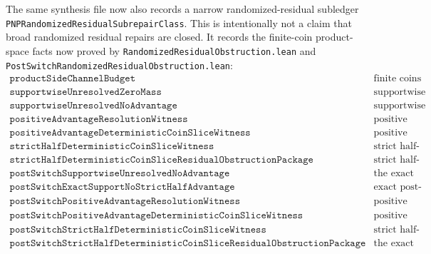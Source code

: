 \documentclass[11pt]{article}
\theoremstyle{remark}
\begin{document}
The same synthesis file now also records a narrow randomized-residual subledger
\texttt{PNPRandomizedResidualSubrepairClass}.  This is intentionally not a
claim that broad randomized residual repairs are closed.  It records the
finite-coin product-space facts now proved by
\texttt{RandomizedResidualObstruction.lean} and
\texttt{PostSwitchRandomizedResidualObstruction.lean}:
\[
\begin{array}{ll}
\texttt{productSideChannelBudget}
  & \text{finite coins are an ordinary product-space side channel,}\\
\texttt{supportwiseUnresolvedZeroMass}
  & \text{supportwise unresolved residuals have zero joint resolving mass,}\\
\texttt{supportwiseUnresolvedNoAdvantage}
  & \text{supportwise unresolved residuals have no positive advantage,}\\
\texttt{positiveAdvantageResolutionWitness}
  & \text{positive advantage yields a positive-weight resolving coin,}\\
\texttt{positiveAdvantageDeterministicCoinSliceWitness}
  & \text{positive advantage yields a deterministic resolving coin slice,}\\
\texttt{strictHalfDeterministicCoinSliceWitness}
  & \text{strict half-accuracy advantage still yields a deterministic resolving coin slice,}\\
\texttt{strictHalfDeterministicCoinSliceResidualObstructionPackage}
  & \text{strict half-accuracy advantage already yields a deterministic slice carrying the ordinary residual obstruction package,}\\
\texttt{postSwitchSupportwiseUnresolvedNoAdvantage}
  & \text{the exact post-switch surface inherits the supportwise blocker,}\\
\texttt{postSwitchExactSupportNoStrictHalfAdvantage}
  & \text{exact post-switch support blocks strict half-accuracy randomized residual advantage,}\\
\texttt{postSwitchPositiveAdvantageResolutionWitness}
  & \text{positive post-switch advantage yields a resolving input/coin pair,}\\
\texttt{postSwitchPositiveAdvantageDeterministicCoinSliceWitness}
  & \text{positive post-switch advantage yields a deterministic resolving coin slice,}\\
\texttt{postSwitchStrictHalfDeterministicCoinSliceWitness}
  & \text{strict half-accuracy post-switch advantage still yields a deterministic resolving coin slice,}\\
\texttt{postSwitchStrictHalfDeterministicCoinSliceResidualObstructionPackage}
  & \text{the exact post-switch strict-half slice already carries the invariant-projection residual obstruction package.}
\end{array}
\]
\end{document}

